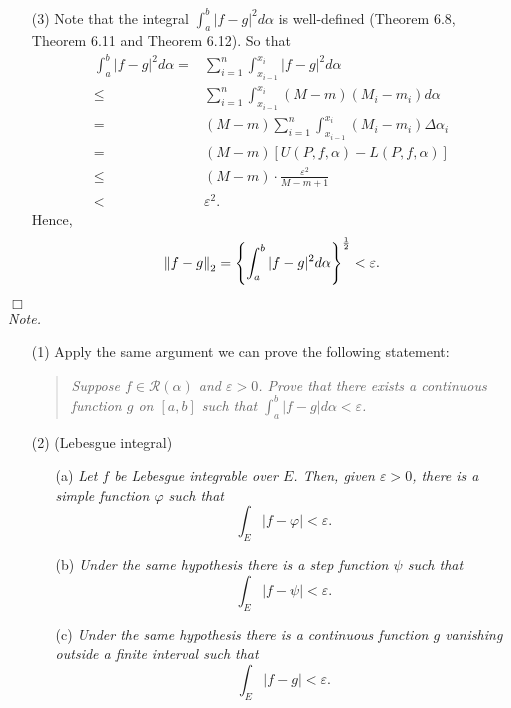 \documentclass{article}
\begin{document}
\begin{enumerate}
\item[(3)]
Note that the integral $\int_{a}^{b} |f-g|^2 d\alpha$ is well-defined
(Theorem 6.8, Theorem 6.11 and Theorem 6.12).
So that
\begin{align*}
  \int_{a}^{b} |f-g|^2 d\alpha
  =& \sum_{i=1}^n \int_{x_{i-1}}^{x_i} |f-g|^2 d\alpha \\
  \leq& \sum_{i=1}^n \int_{x_{i-1}}^{x_i} (M-m)(M_i - m_i) d\alpha \\
  =& (M-m) \sum_{i=1}^n \int_{x_{i-1}}^{x_i} (M_i - m_i) \Delta \alpha_i \\
  =& (M-m) [ U(P,f,\alpha) - L(P,f,\alpha) ] \\
  \leq& (M-m) \cdot \frac{\varepsilon^2}{M - m + 1} \\
  <& \varepsilon^2.
\end{align*}
Hence,
\[
  \norm{f-g}_2
  = \left\{ \int_{a}^{b} |f-g|^2 d\alpha \right\}^{\frac{1}{2}}
  < \varepsilon.
\]
\end{enumerate}
$\Box$ \\



\emph{Note.}
\begin{enumerate}
\item[(1)]
  Apply the same argument we can prove the following statement:
  \begin{quote}
    \emph{Suppose $f \in \mathscr{R}(\alpha)$ and $\varepsilon > 0$.
    Prove that there exists a continuous function $g$ on $[a,b]$
    such that $\int_{a}^{b} |f-g| d\alpha < \varepsilon$.}
  \end{quote}

\item[(2)]
  (Lebesgue integral)
  \begin{enumerate}
    \item[(a)]
    \emph{Let $f$ be Lebesgue integrable over $E$.
    Then, given $\varepsilon > 0$,
    there is a simple function $\varphi$ such that
    \[
      \int_E |f-\varphi| < \varepsilon.
    \]}

    \item[(b)]
    \emph{Under the same hypothesis there is a step function $\psi$ such that
    \[
      \int_E |f-\psi| < \varepsilon.
    \]}

    \item[(c)]
    \emph{Under the same hypothesis there is a continuous function $g$
    vanishing outside a finite interval such that
    \[
      \int_E |f-g| < \varepsilon.
    \]} \\\\
  \end{enumerate}
\end{enumerate}
\end{document}
